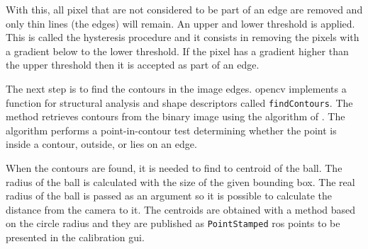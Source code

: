 With this, all pixel that are not considered to be part of an edge are removed and only thin lines (the edges) will remain. An upper and lower threshold is applied. This is called the hysteresis procedure and it consists in removing the pixels with a gradient below to the lower threshold. If the pixel has a gradient higher than the upper threshold then it is accepted as part of an edge.

The next step is to find the contours in the image edges. \gls{opencv} implements a function for structural analysis and shape descriptors called \texttt{findContours}. The method retrieves contours from the binary image using the algorithm of \cite{Suzuki1985}. The algorithm performs a point-in-contour test determining whether the point is inside a contour, outside, or lies on an edge. 

When the contours are found, it is needed to find to centroid of the ball. The radius of the ball is calculated with the size of the given bounding box. The real radius of the ball is passed as an argument so it is possible to calculate the distance from the camera to it. The centroids are obtained with a method based on the circle radius and they are published as \texttt{PointStamped} \gls{ros} points to be presented in the calibration \gls{gui}. 















 

